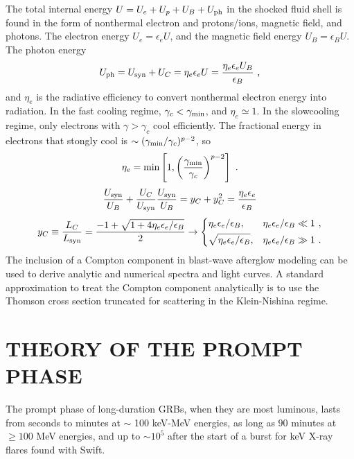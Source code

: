 \documentclass[12pt,a4paper]{article}
\begin{document}
The total internal energy $U = U_e + U_p + U_B + U_{\rm ph}$ in the shocked fluid shell is found in the form of nonthermal electron and protons/ions, magnetic field, and photons. The electron energy $U_e = \epsilon_e U$, and the magnetic field energy $U_B = \epsilon_B U$. The photon energy
\begin{align}
U_{\rm ph} = U_{\rm syn} +U_C = \eta_e \epsilon_e U = \dfrac{\eta_e \epsilon_e U_B}{\epsilon_B} ~,
\end{align}
and $\eta_e$ is the radiative efficiency to convert nonthermal electron energy into radiation. In the fast cooling regime, $\gamma_c < \gamma_{\rm min}$, and $\eta_e \simeq 1$. In the slowcooling regime, only electrons with $\gamma > \gamma_c$ cool efficiently. The fractional energy in electrons that stongly cool is $\sim (\gamma_{\rm min}/\gamma_c)^{p-2}$, so
\begin{align}
\eta_e = {\rm min} \left[1, \left(\dfrac{\gamma_{\rm min}}{\gamma_c} \right)^{p-2} \right] ~.
\end{align}
\begin{align}
\dfrac{U_{\rm syn}}{U_B} +\dfrac{U_C}{U_{\rm syn}} \dfrac{U_{\rm syn}}{U_B} = y_C +y_C^2 = \dfrac{\eta_{e} \epsilon_e}{\epsilon_B}
\end{align}
\begin{align}
y_C \equiv \dfrac{L_C}{L_{\rm syn}} = \dfrac{-1+\sqrt{1+4\eta_e \epsilon_e/\epsilon_B}}{2} \rightarrow \left\{
\begin{aligned}
& \eta_e \epsilon_e/\epsilon_B, & \eta_e \epsilon_e/\epsilon_B \ll 1 ~, \\
& \sqrt{\eta_e \epsilon_e/\epsilon_B}, & \eta_e \epsilon_e/\epsilon_B \gg 1 ~. \\
\end{aligned}
\right.
\end{align}
The inclusion of a Compton component in blast-wave afterglow modeling can be used to derive analytic and numerical spectra and light curves. A standard approximation to treat the Compton component analytically is to use the Thomson cross section truncated for scattering in the Klein-Nishina regime. 




\section{THEORY OF THE PROMPT PHASE}
\cite{2009herb.book.....D} The prompt phase of long-duration GRBs, when they are most luminous, lasts from seconds to minutes at $\sim$ 100 keV-MeV energies, as long as $90$ minutes at $\geqslant 100$ MeV energies, and up to $\sim 10^5$ after the start of a burst for keV X-ray flares found with Swift. 
\end{document}
